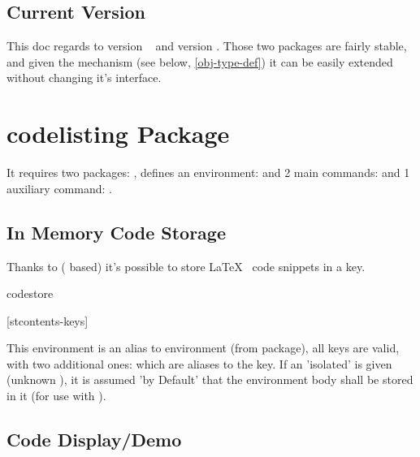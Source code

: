 \documentclass{article}
\begin{document}
\subsection{Current Version}
This doc regards to  version ~ and  version . Those two packages are fairly stable, and given the  mechanism (see below, \ref{obj-type-def}) it can be easily extended without changing it's interface.

\section{codelisting Package}

It requires two packages: ,  defines an environment:  and 
 2 main commands: \tsobj[code]{\tscode,\tsdemo} and 1 auxiliary command: \tsobj{\setcodekeys}.

\subsection{In Memory Code Storage}
Thanks to  ( based) it's possible to store \LaTeX~ code snippets in a  key.


\begin{codedescribe}[env,rulecolor=white]{codestore}
	\begin{codesyntax}
		\tsmacro{\begin{codestore}}[stcontents-keys]{}
    \tsmacro{\end{codestore}}{}
	\end{codesyntax}
This environment is an alias to  environment (from  package), all  keys are valid, with two additional ones:  which are aliases to the  key. If an 'isolated'  is given (unknown ), it is assumed 'by Default' that the environment body shall be stored in it (for use with \tsobj[code]{\tscode,\tsdemo}).
\end{codedescribe}



\subsection{Code Display/Demo}\label{codelist}
\end{document}
